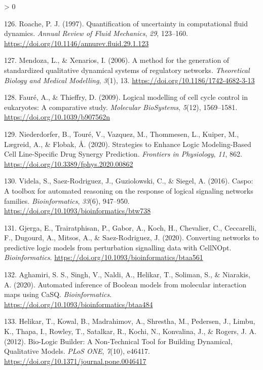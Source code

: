 \documentclass[
  12pt,
]{book}
\newlength{\cslhangindent}
\newenvironment{CSLReferences}[2] %
 {%
  \setlength{\parindent}{0pt}
  \ifodd #1 \everypar{\setlength{\hangindent}{\cslhangindent}}\ignorespaces\fi
  \ifnum #2 > 0
  \setlength{\parskip}{#2\baselineskip}
  \fi
 }%
 {}
\begin{document}
\begin{CSLReferences}{1}{0}
\leavevmode\hypertarget{ref-Roache1997}{}%
126. Roache, P. J. (1997). {Quantification of uncertainty in computational fluid dynamics}. \emph{Annual Review of Fluid Mechanics}, \emph{29}, 123--160. \url{https://doi.org/10.1146/annurev.fluid.29.1.123}

\leavevmode\hypertarget{ref-Mendoza2006}{}%
127. Mendoza, L., \& Xenarios, I. (2006). {A method for the generation of standardized qualitative dynamical systems of regulatory networks}. \emph{Theoretical Biology and Medical Modelling}, \emph{3}(1), 13. \url{https://doi.org/10.1186/1742-4682-3-13}

\leavevmode\hypertarget{ref-Faure2009}{}%
128. Fauré, A., \& Thieffry, D. (2009). {Logical modelling of cell cycle control in eukaryotes: A comparative study}. \emph{Molecular BioSystems}, \emph{5}(12), 1569--1581. \url{https://doi.org/10.1039/b907562n}

\leavevmode\hypertarget{ref-Niederdorfer2020}{}%
129. Niederdorfer, B., Touré, V., Vazquez, M., Thommesen, L., Kuiper, M., Lægreid, A., \& Flobak, Å. (2020). {Strategies to Enhance Logic Modeling-Based Cell Line-Specific Drug Synergy Prediction}. \emph{Frontiers in Physiology}, \emph{11}, 862. \url{https://doi.org/10.3389/fphys.2020.00862}

\leavevmode\hypertarget{ref-Videla2016}{}%
130. Videla, S., Saez-Rodriguez, J., Guziolowski, C., \& Siegel, A. (2016). Caspo: A toolbox for automated reasoning on the response of logical signaling networks families. \emph{Bioinformatics}, \emph{33}(6), 947--950. \url{https://doi.org/10.1093/bioinformatics/btw738}

\leavevmode\hypertarget{ref-Gjerga2020}{}%
131. Gjerga, E., Trairatphisan, P., Gabor, A., Koch, H., Chevalier, C., Ceccarelli, F., Dugourd, A., Mitsos, A., \& Saez-Rodriguez, J. (2020). {Converting networks to predictive logic models from perturbation signalling data with CellNOpt}. \emph{Bioinformatics}. \url{https://doi.org/10.1093/bioinformatics/btaa561}

\leavevmode\hypertarget{ref-Aghamiri2020}{}%
132. Aghamiri, S. S., Singh, V., Naldi, A., Helikar, T., Soliman, S., \& Niarakis, A. (2020). {Automated inference of Boolean models from molecular interaction maps using CaSQ}. \emph{Bioinformatics}. \url{https://doi.org/10.1093/bioinformatics/btaa484}

\leavevmode\hypertarget{ref-Helikar2012}{}%
133. Helikar, T., Kowal, B., Madrahimov, A., Shrestha, M., Pedersen, J., Limbu, K., Thapa, I., Rowley, T., Satalkar, R., Kochi, N., Konvalina, J., \& Rogers, J. A. (2012). {Bio-Logic Builder: A Non-Technical Tool for Building Dynamical, Qualitative Models}. \emph{PLoS ONE}, \emph{7}(10), e46417. \url{https://doi.org/10.1371/journal.pone.0046417}


\end{CSLReferences}
\end{document}
